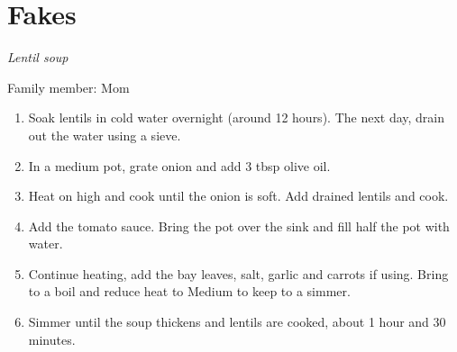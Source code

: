 \chapter{Fakes}
\label{ch:fakes}
\textit{Lentil soup}

Family member: Mom



\begin{enumerate}
    \item Soak lentils in cold water overnight (around 12 hours). The next day, drain out the water using a sieve.
    \item In a medium pot, grate onion and add 3 tbsp olive oil.
    \item Heat on high and cook until the onion is soft. Add drained lentils and cook.
    \item Add the tomato sauce. Bring the pot over the sink and fill half the pot with water.
    \item Continue heating, add the bay leaves, salt, garlic and carrots if using. Bring to a boil and reduce heat to Medium to keep to a simmer.
    \item Simmer until the soup thickens and lentils are cooked, about 1 hour and 30 minutes.
\end{enumerate}

